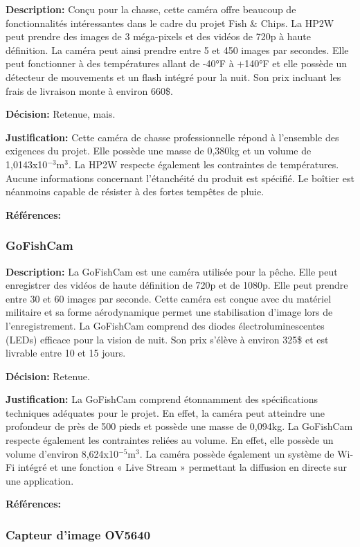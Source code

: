\textbf{Description:} Conçu pour la chasse, cette caméra offre beaucoup de fonctionnalités intéressantes dans le cadre du projet Fish \& Chips. La HP2W peut prendre des images de 3 méga-pixels et des vidéos de 720p à haute définition. La caméra peut ainsi prendre entre 5 et 450 images par secondes. Elle peut fonctionner à des températures allant de -40°F à +140°F et elle possède un détecteur de mouvements et un flash intégré pour la nuit. Son prix incluant les frais de livraison monte à environ 660\$.

\textbf{Décision:} Retenue, mais.

\textbf{Justification:} Cette caméra de chasse professionnelle répond à l'ensemble des exigences du projet. Elle possède une masse de 0,380kg et un volume de 1,0143x10$^{-3}$m$^3$. La HP2W respecte également les contraintes de températures. Aucune informations concernant l'étanchéité du produit est spécifié. Le boîtier est néanmoins capable de résister à des fortes tempêtes de pluie.

\textbf{Références:} \cite{HP2W}


\subsubsection{GoFishCam}

\textbf{Description:} La GoFishCam est une caméra utilisée pour la pêche. Elle peut enregistrer des vidéos de haute définition de 720p et de 1080p. Elle peut prendre entre 30 et 60 images par seconde. Cette caméra est conçue avec du matériel militaire et sa forme aérodynamique permet une stabilisation d'image lors de l'enregistrement. La GoFishCam comprend des diodes électroluminescentes (LEDs) efficace pour la vision de nuit. Son prix s'élève à environ 325\$ et est livrable entre 10 et 15 jours.

\textbf{Décision:} Retenue.

\textbf{Justification:} La GoFishCam comprend étonnamment des spécifications techniques adéquates pour le projet. En effet, la caméra peut atteindre une profondeur de près de 500 pieds et possède une masse de 0,094kg. La GoFishCam respecte également les contraintes reliées au volume. En effet, elle possède un volume d'environ 8,624x10$^{-5}$m$^3$. La caméra possède également un système de Wi-Fi intégré et une fonction « Live Stream » permettant la diffusion en directe sur une application.

\textbf{Références:} \cite{GoFishCam} 


\subsubsection{Capteur d'image OV5640}
\label{subsubsection:camera_custom}

